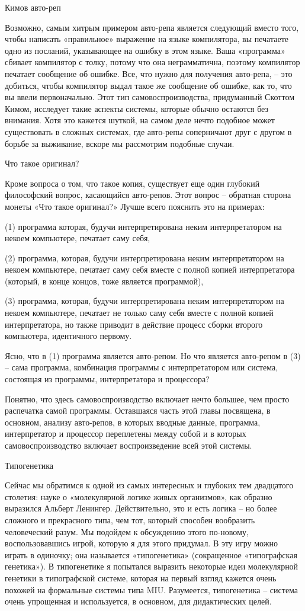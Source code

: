 \documentclass[../main.tex]{subfiles}
\begin{document}
Кимов авто-реп

Возможно, самым хитрым примером авто-репа является следующий вместо того, чтобы написать «правильное» выражение на языке компилятора, вы печатаете одно из посланий, указывающее на ошибку в этом языке. Ваша «программа» сбивает компилятор с толку, потому что она неграмматична, поэтому компилятор печатает сообщение об ошибке. Все, что нужно для получения авто-репа, \--- это добиться, чтобы компилятор выдал такое же сообщение об ошибке, как то, что вы ввели первоначально. Этот тип самовоспроизводства, придуманный Скоттом Кимом, исследует такие аспекты системы, которые обычно остаются без внимания. Хотя это кажется шуткой, на самом деле нечто подобное может существовать в сложных системах, где авто-репы соперничают друг с другом в борьбе за выживание, вскоре мы рассмотрим подобные случаи.

Что такое оригинал?

Кроме вопроса о том, что такое копия, существует еще один глубокий философский вопрос, касающийся авто-репов. Этот вопрос \--- обратная сторона монеты «Что такое оригинал?» Лучше всего пояснить это на примерах:

(1) программа которая, будучи интерпретирована неким интерпретатором на некоем компьютере, печатает саму себя,

(2) программа, которая, будучи интерпретирована неким интерпретатором на некоем компьютере, печатает саму себя вместе с полной копией интерпретатора (который, в конце концов, тоже является программой),

(3) программа, которая, будучи интерпретирована неким интерпретатором на некоем компьютере, печатает не только саму себя вместе с полной копией интерпретатора, но также приводит в действие процесс сборки второго компьютера, идентичного первому.

Ясно, что в (1) программа является авто-репом. Но что является авто-репом в (3) \--- сама программа, комбинация программы с интерпретатором или система, состоящая из программы, интерпретатора и процессора?

Понятно, что здесь самовоспроизводство включает нечто большее, чем просто распечатка самой программы. Оставшаяся часть этой главы посвящена, в основном, анализу авто-репов, в которых вводные данные, программа, интерпретатор и процессор переплетены между собой и в которых самовоспроизводство включает воспроизведение всей этой системы.

Типогенетика

Сейчас мы обратимся к одной из самых интересных и глубоких тем двадцатого столетия: науке о «молекулярной логике живых организмов», как образно выразился Альберт Ленингер. Действительно, это и есть логика \--- но более сложного и прекрасного типа, чем тот, который способен вообразить человеческий разум. Мы подойдем к обсуждению этого по-новому, воспользовавшись игрой, которую я для этого придумал. В эту игру можно играть в одиночку; она называется «типогенетика» (сокращенное «типографская генетика»). В типогенетике я попытался выразить некоторые идеи молекулярной генетики в типографской системе, которая на первый взгляд кажется очень похожей на формальные системы типа MIU\@. Разумеется, типогенетика \--- система очень упрощенная и используется, в основном, для дидактических целей.
\end{document}
